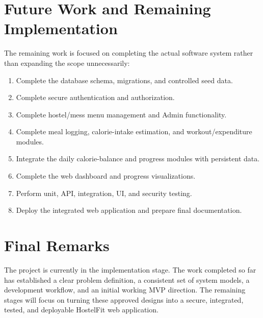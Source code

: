 \documentclass[11pt,a4paper]{article}
\begin{document}
\section{Future Work and Remaining Implementation}
The remaining work is focused on completing the actual software system rather than expanding the scope unnecessarily:
\begin{enumerate}
    \item Complete the database schema, migrations, and controlled seed data.
    \item Complete secure authentication and authorization.
    \item Complete hostel/mess menu management and Admin functionality.
    \item Complete meal logging, calorie-intake estimation, and workout/expenditure modules.
    \item Integrate the daily calorie-balance and progress modules with persistent data.
    \item Complete the web dashboard and progress visualizations.
    \item Perform unit, API, integration, UI, and security testing.
    \item Deploy the integrated web application and prepare final documentation.
\end{enumerate}

\section{Final Remarks}
The project is currently in the implementation stage. The work completed so far has established a clear problem definition, a consistent set of system models, a development workflow, and an initial working MVP direction. The remaining stages will focus on turning these approved designs into a secure, integrated, tested, and deployable HostelFit web application.
\end{document}
